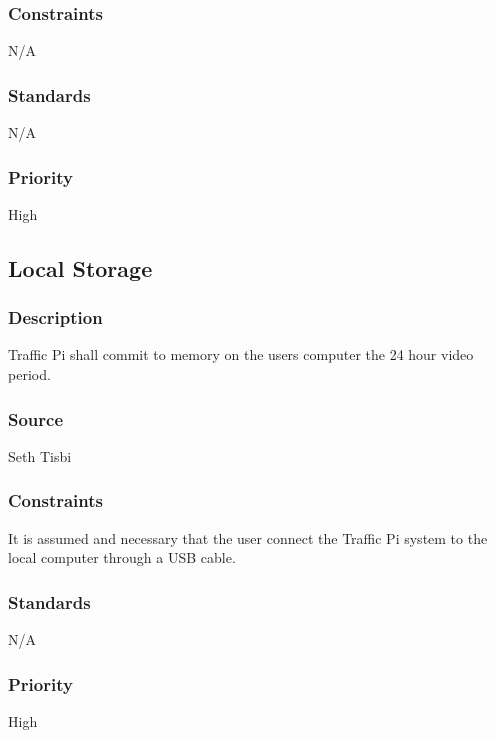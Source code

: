 \subsubsection{Constraints}
N/A
\subsubsection{Standards}
N/A
\subsubsection{Priority}
High

\subsection{Local Storage}
\subsubsection{Description}
Traffic Pi shall commit to memory on the users computer the 24 hour video period.
\subsubsection{Source}
Seth Tisbi
\subsubsection{Constraints}
It is assumed and necessary that the user connect the Traffic Pi system to the local computer through a USB cable.
\subsubsection{Standards}
N/A
\subsubsection{Priority}
High
